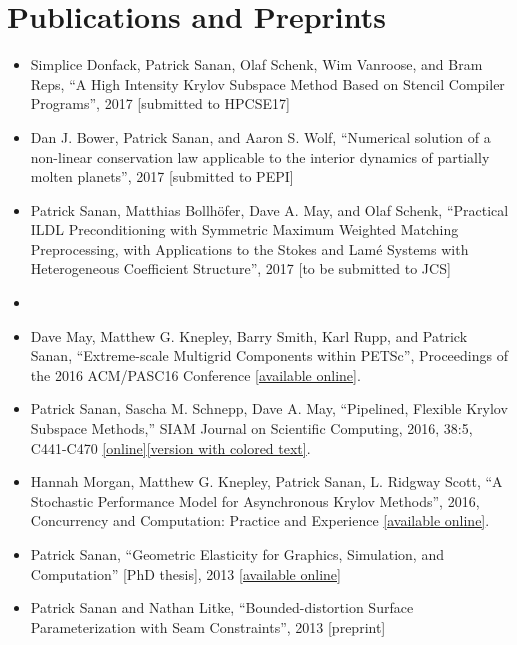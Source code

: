 \documentclass[12pt]{article}
\begin{document}
\section*{Publications and Preprints}
\begin{itemize}
\item Simplice Donfack, Patrick Sanan, Olaf Schenk, Wim Vanroose, and Bram Reps, ``A High Intensity Krylov Subspace Method Based on Stencil Compiler Programs'', 2017 [submitted to HPCSE17]
\item Dan J. Bower, Patrick Sanan, and Aaron S. Wolf, ``Numerical solution of a non-linear conservation law applicable to the interior dynamics of partially molten planets'', 2017 [submitted to PEPI]
\item Patrick Sanan, Matthias Bollh\"{o}fer, Dave A. May, and Olaf Schenk, ``Practical ILDL Preconditioning with Symmetric Maximum Weighted Matching Preprocessing, with Applications to the Stokes and Lam\'{e} Systems with Heterogeneous Coefficient Structure'', 2017 [to be submitted to JCS]
\item {}
\item Dave May, Matthew G. Knepley, Barry Smith, Karl Rupp, and Patrick Sanan, ``Extreme-scale Multigrid Components within PETSc'', Proceedings of the 2016 ACM/PASC16 Conference [\href{http://dl.acm.org/citation.cfm?doid=2929908.2929913}{available online}].
\item Patrick Sanan, Sascha M. Schnepp, Dave A. May, ``Pipelined, Flexible Krylov Subspace Methods,'' SIAM Journal on Scientific Computing, 2016, 38:5, C441-C470 \href{http://dx.doi.org/10.1137/15M1049130}{[online]}\href{http://arxiv.org/abs/1511.07226}{[version with colored text]}.
\item Hannah Morgan, Matthew G. Knepley, Patrick Sanan, L. Ridgway Scott, ``A Stochastic Performance Model for Asynchronous Krylov Methods'', 2016, Concurrency and Computation: Practice and Experience \href{http://onlinelibrary.wiley.com/doi/10.1002/cpe.3820/full}{[available online]}.
\item Patrick Sanan, ``Geometric Elasticity for Graphics, Simulation, and Computation'' [PhD thesis], 2013 \href{http://resolver.caltech.edu/CaltechTHESIS:12052013-121547860}{[available online]}
\item Patrick Sanan and Nathan Litke, ``Bounded-distortion Surface Parameterization with Seam Constraints'', 2013 [preprint]

\end{itemize}
\end{document}
